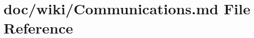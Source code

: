\hypertarget{_communications_8md}{}\section{doc/wiki/\+Communications.md File Reference}
\label{_communications_8md}
